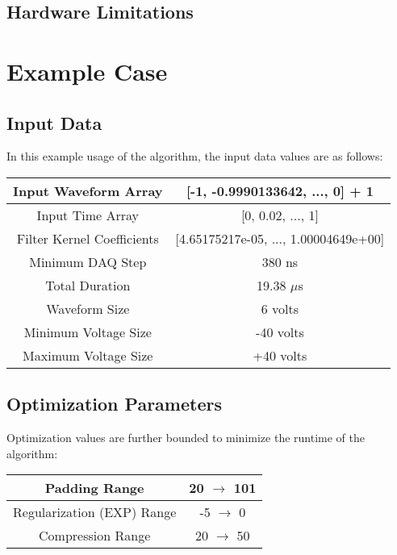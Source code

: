 \subsection{Hardware Limitations}






\section{Example Case}
\subsection{Input Data}
In this example usage of the algorithm, the input data values are as follows:

\begin{center}
\begin{tabular}{ | c | c | } 
  \hline
   Input Waveform Array & [-1, -0.9990133642, ..., 0] + 1 \\ 
  \hline
  Input Time Array & [0, 0.02, ..., 1] \\ 
  \hline
  Filter Kernel Coefficients & [4.65175217e-05, ..., 1.00004649e+00] \\ 
  \hline
  Minimum DAQ Step & 380 ns \\ 
  \hline
  Total Duration & 19.38 $\mu$s \\ 
  \hline
  Waveform Size & 6 volts \\ 
  \hline
  Minimum Voltage Size & -40 volts \\ 
  \hline
  Maximum Voltage Size & +40 volts \\ 
  \hline
\end{tabular}
\end{center}

\subsection{Optimization Parameters}
Optimization values are further bounded to minimize the runtime of the algorithm:

\begin{center}
\begin{tabular}{ | c | c | } 
  \hline
   Padding Range & 20 $\rightarrow$ 101 \\ 
  \hline
  Regularization (EXP) Range & -5 $\rightarrow$ 0 \\ 
  \hline
  Compression Range & 20 $\rightarrow$ 50 \\ 
  \hline
\end{tabular}
\end{center}

